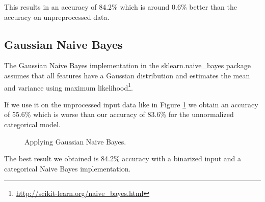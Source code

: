 \documentclass{support/acm_proc_article-sp}
\begin{document}
    This results in an accuracy of 84.2\% which is around 0.6\% better than the accuracy on unpreprocessed data.

    \subsection{Gaussian Naive Bayes}

    The Gaussian Naive Bayes implementation in the sklearn.naive\_bayes package assumes that all features have a
    Gaussian distribution and estimates the mean and variance using maximum
    likelihood\footnote{\href{http://scikit-learn.org/stable/modules/naive_bayes.html\#gaussian-naive-bayes}{http://scikit-learn.org/naive\_bayes.html}}.

    If we use it on the unprocessed input data like in Figure \ref{fig:gaussian} we obtain an accuracy of 55.6\% which
    is worse than our accuracy of 83.6\% for the unnormalized categorical model.
    \begin{figure}[htbp]
        \centering
        \lstset{numbers=none,xleftmargin=0em}
        
        \caption{Applying Gaussian Naive Bayes.}
        \label{fig:gaussian}
    \end{figure}

    The best result we obtained is 84.2\% accuracy with a binarized input and a categorical Naive Bayes implementation.


    
    
\end{document}
